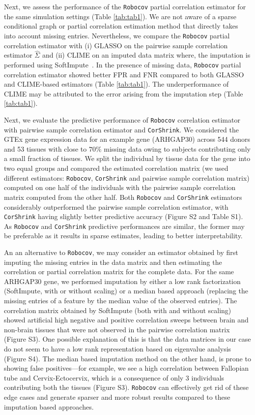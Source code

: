 \documentclass{bioinfo}
\def\CorShrink{\texttt{CorShrink}}
\def\Robocov{\texttt{Robocov}}
\begin{document}
\normalsize
Next, we assess the performance of the \Robocov{} partial correlation estimator for the same simulation settings (Table \ref{tab:tab1}). We are not aware of a sparse conditional graph or partial correlation estimation method that directly takes into account missing entries. Nevertheless, we compare the \Robocov{} partial correlation estimator with (i) GLASSO on the pairwise sample correlation estimator $\hat{\Sigma}$ and (ii) CLIME on an imputed data matrix where, the imputation is performed using SoftImpute~\cite{mazumder2015}. In the presence of missing data, \Robocov{} partial correlation estimator showed better FPR and FNR compared to both GLASSO and CLIME-based estimators (Table \ref{tab:tab1}). The underperformance of CLIME may be attributed to the error arising from the imputation step (Table \ref{tab:tab1}).


Next, we evaluate the predictive performance of \Robocov{} correlation estimator with pairwise sample correlation estimator and \CorShrink{}. We considered the GTEx gene expression data for an example gene (ARHGAP30) across 544 donors and 53 tissues with close to $70 \%$ missing data owing to subjects contributing only a small fraction of tissues. We split the individual by tissue data for the gene into two equal groups and  compared the estimated correlation matrix (we used different estimators: \Robocov{}, \CorShrink{} and pairwise sample correlation matrix) computed on one half of the individuals with the pairwise sample correlation matrix computed from the other half.  Both \Robocov{} and \CorShrink{} estimators considerably outperformed the pairwise sample correlation estimator, with \CorShrink{} having slightly better predictive accuracy (Figure S2 and Table S1). As \Robocov{} and \CorShrink{} predictive performances are similar, the former may be preferable 
as it results in sparse estimates, leading to better interpretability. 


An an alternative to \Robocov{}, we may consider an estimator obtained by first imputing the missing entries in the data matrix and then estimating the correlation or partial correlation matrix for the complete data. For the same ARHGAP30 gene, we performed imputation by either a low rank factorization (SoftImpute\cite{mazumder2015}, with or without scaling) or a median based approach (replacing the missing entries of a feature by the median value of the observed entries). The correlation matrix obtained by SoftImpute (both  with and without scaling) showed artificial high negative and positive correlation sweeps between brain and non-brain tissues that were not observed in the pairwise correlation matrix (Figure S3). One possible explanation of this is that the data matrices in our case do not seem to have a low rank representation based on eigenvalue analysis (Figure S4).  The median based imputation method on the other hand, is prone to showing false positives---for example, we see a high correlation between Fallopian tube and Cervix-Ectocervix, which is a consequence of only 3 individuals contributing  both the tissues (Figure S3). \Robocov{} can effectively get rid of these edge cases and generate sparser and more robust results compared to these imputation based approaches.
\end{document}
